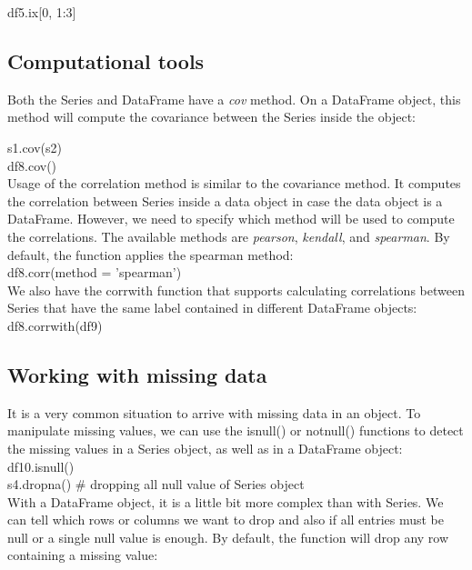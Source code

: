 \documentclass{article}
\numberwithin{equation}{section} %
\begin{document}
df5.ix[0, 1:3] \\

\subsection*{Computational tools}

Both the Series and DataFrame have a \textit{cov} method. On a DataFrame object, this
method will compute the covariance between the Series inside the object:

s1.cov(s2) \\

df8.cov() \\

Usage of the correlation method is similar to the covariance method. It computes the
correlation between Series inside a data object in case the data object is a DataFrame. However, we need to specify which method will be used to compute the correlations. The available methods are \textit{pearson}, \textit{kendall}, and \textit{spearman}. By default, the function applies the spearman method: \\

df8.corr(method = 'spearman') \\

We also have the corrwith function that supports calculating correlations between
Series that have the same label contained in different DataFrame objects: \\

df8.corrwith(df9) \\


\subsection*{Working with missing data}

 It is a very common situation to arrive with missing data in an object. To manipulate missing values, we can use the isnull() or notnull() functions to
 detect the missing values in a Series object, as well as in a DataFrame object: \\
 
 df10.isnull() \\
 
 s4.dropna() 	\hspace{2cm}	\# dropping all null value of Series object\\
 
 With a DataFrame object, it is a little bit more complex than with Series. We can tell which rows or columns we want to drop and also if all entries must be null or a
 single null value is enough. By default, the function will drop any row containing a
 missing value: \\
 
\end{document}
